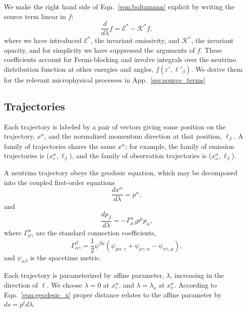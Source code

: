 \documentclass[aps,prd,twocolumn,superscriptaddress,groupedaddress]{revtex4}
\begin{document}
We make the right hand side of Eqn.~\ref{eqn:boltzmann} explicit by writing
the source term linear in $f$:
\begin{equation}
  \label{eqn:boltzmann_linear}
  \frac{d}{d\lambda}f =
  \mathscr{E}^* - \mathscr{K}^* f,
\end{equation}
where we have introduced
$\mathscr{E}^*$, the invariant emissivity, and
$\mathscr{K}^*$, the invariant opacity, and for simplicity we have suppressed
the arguments of $f$.
These coefficients account for Fermi-blocking and involve integrals over the
neutrino distribution function at other energies and angles,
$f(\varepsilon', \ell'_\beta)$.
We derive them for the relevant microphysical processes in
App.~\ref{sec:source_terms}

\subsection{Trajectories}
\label{ssc:trajectories}
Each trajectory is labeled by a pair of vectors
giving some position on the trajectory, $x^\alpha$,
and the normalized momentum direction at that position,
$\ell_\beta$.
A family of trajectories shares the same $x^\alpha$; for example,
the family of emission trajectories is ($x^\alpha_e,\ell_\beta$),
and the family of observation trajectories is ($x^\alpha_o,\ell_\beta$).

A neutrino trajectory obeys the geodesic equation, which may be decomposed into
the coupled first-order equations
\begin{equation}
\label{eqn:geodesic_x}
  \frac{d x^\alpha}{d\lambda} = p^\alpha,
\end{equation}
and
\begin{equation}
\label{eqn:geodesic_p}
  \frac{d p_\beta}{d\lambda} = -\Gamma^\alpha_{\mu\beta} p^\mu p_\alpha,
\end{equation}
where $\Gamma^\alpha_{\mu\gamma}$ are the standard connection coefficients,
\begin{equation}
  \label{eqn:christoffel}
  \Gamma^\beta_{\alpha\gamma} =
  \frac{1}{2} \psi^{\beta\mu}
  (\psi_{\mu\alpha,\gamma} + \psi_{\mu\gamma,\alpha} - \psi_{\alpha\gamma,\mu}),
\end{equation}
and $\psi_{\alpha\beta}$ is the spacetime metric.

Each trajectory is parameterized by affine parameter, $\lambda$, increasing in
the direction of $\ell$. We choose $\lambda=0$ at $x^\alpha_e$.
and $\lambda=\lambda_o$ at $x^\alpha_o$.
According to Eqn.~\ref{eqn:geodesic_x} proper distance relates to the affine
parameter by $ds=p^t d\lambda$.
\end{document}
